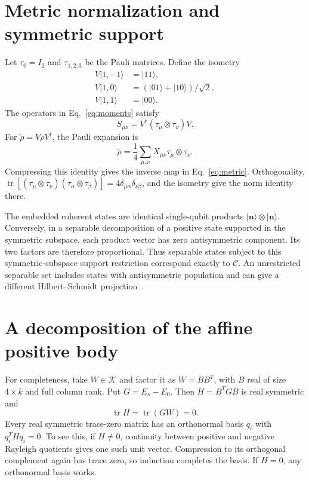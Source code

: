 \documentclass[aps,pra,reprint,amsmath,amssymb,superscriptaddress,longbibliography]{revtex4-2}
\newcommand{\tr}{\operatorname{tr}}
\newcommand{\Id}{I}
\newcommand{\Ccal}{\mathcal C}
\newcommand{\Kcal}{\mathcal K}
\newcommand{\ket}[1]{\lvert #1\rangle}
\begin{document}
\appendix
\section{Metric normalization and symmetric support}
\label{app:metric}

Let \(\tau_0=\Id_2\) and \(\tau_{1,2,3}\) be the Pauli matrices. Define the isometry
\begin{align}
 V\ket{1,-1}&=\ket{11},\nonumber\\
 V\ket{1,0}&=(\ket{01}+\ket{10})/\sqrt2,\nonumber\\
 V\ket{1,1}&=\ket{00}.
\end{align}
The operators in Eq.~\eqref{eq:moments} satisfy
\begin{equation}
 S_{\mu\nu}=V^\dagger(\tau_\mu\otimes\tau_\nu)V.
\end{equation}
For \(\widetilde\rho=V\rho V^\dagger\), the Pauli expansion is
\begin{equation}
 \widetilde\rho=\frac14\sum_{\mu,\nu}
       X_{\mu\nu}\tau_\mu\otimes\tau_\nu.
\end{equation}
Compressing this identity gives the inverse map in Eq.~\eqref{eq:metric}. Orthogonality,
\(\tr[(\tau_\mu\otimes\tau_\nu)(\tau_\alpha\otimes\tau_\beta)]
=4\delta_{\mu\alpha}\delta_{\nu\beta}\),
and the isometry give the norm identity there.

The embedded coherent states are identical single-qubit products \(\ket{\bm n}\otimes\ket{\bm n}\). Conversely, in a separable decomposition of a positive state supported in the symmetric subspace, each product vector has zero antisymmetric component. Its two factors are therefore proportional. Thus separable states subject to this symmetric-subspace support restriction correspond exactly to \(\Ccal\). An unrestricted separable set includes states with antisymmetric population and can give a different Hilbert--Schmidt projection~\cite{BohnetTensor2016}.

\section{A decomposition of the affine positive body}
\label{app:hull}

For completeness, take \(W\in\Kcal\) and factor it as \(W=BB^T\), with \(B\) real of size \(4\times k\) and full column rank. Put \(G=E_s-E_0\). Then \(H=B^TGB\) is real symmetric and
\begin{equation}
 \tr H=\tr(GW)=0.
\end{equation}
Every real symmetric trace-zero matrix has an orthonormal basis \(q_i\) with \(q_i^THq_i=0\). To see this, if \(H\neq0\), continuity between positive and negative Rayleigh quotients gives one such unit vector. Compression to its orthogonal complement again has trace zero, so induction completes the basis. If \(H=0\), any orthonormal basis works.
\end{document}
